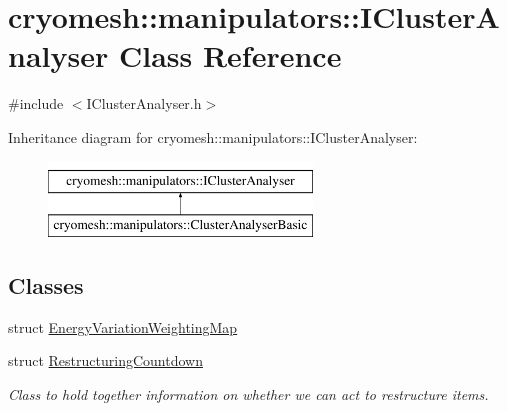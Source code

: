 \hypertarget{classcryomesh_1_1manipulators_1_1IClusterAnalyser}{\section{cryomesh\-:\-:manipulators\-:\-:\-I\-Cluster\-Analyser \-Class \-Reference}
\label{classcryomesh_1_1manipulators_1_1IClusterAnalyser}
}


{\ttfamily \#include $<$\-I\-Cluster\-Analyser.\-h$>$}

\-Inheritance diagram for cryomesh\-:\-:manipulators\-:\-:\-I\-Cluster\-Analyser\-:\begin{figure}[H]
\begin{center}
\leavevmode
\includegraphics[height=2.000000cm]{classcryomesh_1_1manipulators_1_1IClusterAnalyser}
\end{center}
\end{figure}
\subsection*{\-Classes}
\begin{DoxyCompactItemize}
\item 
struct \hyperlink{structcryomesh_1_1manipulators_1_1IClusterAnalyser_1_1EnergyVariationWeightingMap}{\-Energy\-Variation\-Weighting\-Map}
\item 
struct \hyperlink{structcryomesh_1_1manipulators_1_1IClusterAnalyser_1_1RestructuringCountdown}{\-Restructuring\-Countdown}
\begin{DoxyCompactList}\small\item\em \-Class to hold together information on whether we can act to restructure items. \end{DoxyCompactList}\end{DoxyCompactItemize}
